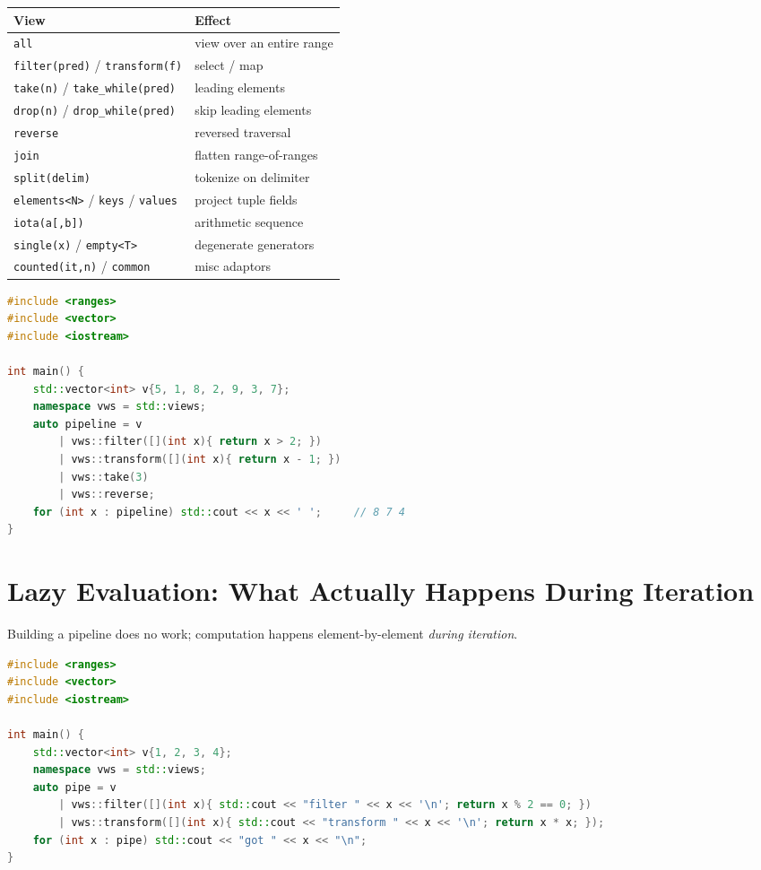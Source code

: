 \begin{center}
\begin{tabular}{ll}
\hline
\textbf{View} & \textbf{Effect} \\
\hline
\texttt{all} & view over an entire range \\
\texttt{filter(pred)} / \texttt{transform(f)} & select / map \\
\texttt{take(n)} / \texttt{take\_while(pred)} & leading elements \\
\texttt{drop(n)} / \texttt{drop\_while(pred)} & skip leading elements \\
\texttt{reverse} & reversed traversal \\
\texttt{join} & flatten range-of-ranges \\
\texttt{split(delim)} & tokenize on delimiter \\
\texttt{elements<N>} / \texttt{keys} / \texttt{values} & project tuple fields \\
\texttt{iota(a[,b])} & arithmetic sequence \\
\texttt{single(x)} / \texttt{empty<T>} & degenerate generators \\
\texttt{counted(it,n)} / \texttt{common} & misc adaptors \\
\hline
\end{tabular}
\end{center}

\begin{lstlisting}[language=C++,caption={Composing several adaptors}]
#include <ranges>
#include <vector>
#include <iostream>

int main() {
    std::vector<int> v{5, 1, 8, 2, 9, 3, 7};
    namespace vws = std::views;
    auto pipeline = v
        | vws::filter([](int x){ return x > 2; })
        | vws::transform([](int x){ return x - 1; })
        | vws::take(3)
        | vws::reverse;
    for (int x : pipeline) std::cout << x << ' ';     // 8 7 4
}
\end{lstlisting}

\section{Lazy Evaluation: What Actually Happens During Iteration}
\label{sec:c20-laziness}

Building a pipeline does no work; computation happens element-by-element \emph{during iteration}.

\begin{lstlisting}[language=C++,caption={Laziness: each element flows through the whole chain on demand}]
#include <ranges>
#include <vector>
#include <iostream>

int main() {
    std::vector<int> v{1, 2, 3, 4};
    namespace vws = std::views;
    auto pipe = v
        | vws::filter([](int x){ std::cout << "filter " << x << '\n'; return x % 2 == 0; })
        | vws::transform([](int x){ std::cout << "transform " << x << '\n'; return x * x; });
    for (int x : pipe) std::cout << "got " << x << "\n";
}
\end{lstlisting}

